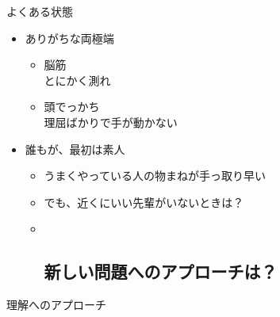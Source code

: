 \begin{frame}

\begin{block}{よくある状態}

\begin{itemize}
\tightlist
\item
  ありがちな両極端

  \begin{itemize}
  \tightlist
  \item
    脳筋\\
    とにかく測れ
  \item
    頭でっかち\\
    理屈ばかりで手が動かない
  \end{itemize}
\item
  誰もが、最初は素人

  \begin{itemize}
  \item
    うまくやっている人の物まねが手っ取り早い
  \item
    でも、近くにいい先輩がいないときは？
  \item ~
    \hypertarget{ux65b0ux3057ux3044ux554fux984cux3078ux306eux30a2ux30d7ux30edux30fcux30c1ux306f}{%
    \subsection{新しい問題へのアプローチは？}\label{ux65b0ux3057ux3044ux554fux984cux3078ux306eux30a2ux30d7ux30edux30fcux30c1ux306f}}
  \end{itemize}
\end{itemize}

\end{block}

\begin{block}{理解へのアプローチ}

\end{block}

\end{frame}

